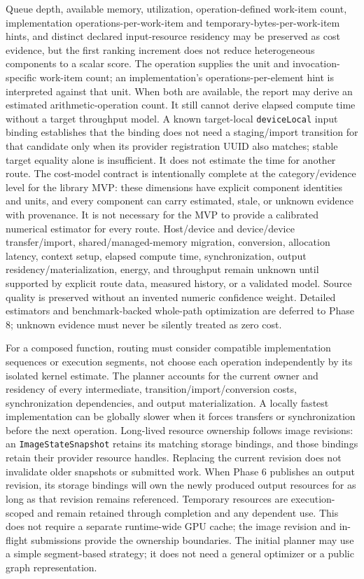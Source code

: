 \documentclass[11pt,a4paper,oneside]{article}
\begin{document}
Queue depth, available memory, utilization, operation-defined work-item count, implementation operations-per-work-item and temporary-bytes-per-work-item hints, and distinct declared input-resource residency may be preserved as cost evidence, but the first ranking increment does not reduce heterogeneous components to a scalar score. The operation supplies the unit and invocation-specific work-item count; an implementation's operations-per-element hint is interpreted against that unit. When both are available, the report may derive an estimated arithmetic-operation count. It still cannot derive elapsed compute time without a target throughput model. A known target-local \texttt{deviceLocal} input binding establishes that the binding does not need a staging/import transition for that candidate only when its provider registration UUID also matches; stable target equality alone is insufficient. It does not estimate the time for another route. The cost-model contract is intentionally complete at the category/evidence level for the library MVP: these dimensions have explicit component identities and units, and every component can carry estimated, stale, or unknown evidence with provenance. It is not necessary for the MVP to provide a calibrated numerical estimator for every route. Host/device and device/device transfer/import, shared/managed-memory migration, conversion, allocation latency, context setup, elapsed compute time, synchronization, output residency/materialization, energy, and throughput remain unknown until supported by explicit route data, measured history, or a validated model. Source quality is preserved without an invented numeric confidence weight. Detailed estimators and benchmark-backed whole-path optimization are deferred to Phase 8; unknown evidence must never be silently treated as zero cost.

For a composed function, routing must consider compatible implementation sequences or execution segments, not choose each operation independently by its isolated kernel estimate. The planner accounts for the current owner and residency of every intermediate, transition/import/conversion costs, synchronization dependencies, and output materialization. A locally fastest implementation can be globally slower when it forces transfers or synchronization before the next operation. Long-lived resource ownership follows image revisions: an \texttt{ImageStateSnapshot} retains its matching storage bindings, and those bindings retain their provider resource handles. Replacing the current revision does not invalidate older snapshots or submitted work. When Phase 6 publishes an output revision, its storage bindings will own the newly produced output resources for as long as that revision remains referenced. Temporary resources are execution-scoped and remain retained through completion and any dependent use. This does not require a separate runtime-wide GPU cache; the image revision and in-flight submissions provide the ownership boundaries. The initial planner may use a simple segment-based strategy; it does not need a general optimizer or a public graph representation.
\end{document}

